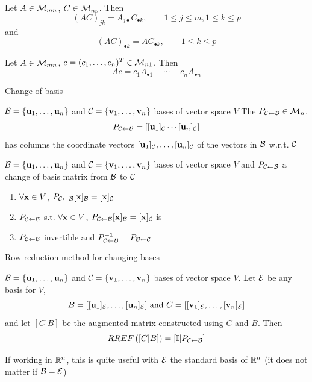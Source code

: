 \documentclass[aspectratio=169]{beamer}
\begin{document}
\begin{frame}
\begin{theorem}
Let $A\in\mathcal{M}_{mn}$, $C\in\mathcal{M}_{np}$. Then
\[
(AC)_{jk}=A_{j\bullet}C_{\bullet k},\qquad 1\leq j\leq m,1\leq k\leq p
\]
and
\[
(AC)_{\bullet k}=AC_{\bullet k},\qquad 1\leq k\leq p
\]
\end{theorem}
\vfill
\begin{theorem}
Let $A\in\mathcal{M}_{mn}$, $c=(c_1,\ldots,c_n)^T\in\mathcal{M}_{n1}$. Then
\[
Ac = c_1A_{\bullet 1}+\cdots+c_nA_{\bullet n}
\]
\end{theorem}
\end{frame}

\begin{frame}{Change of basis}
\begin{definition}
$\mathcal{B}=\{\mathbf{u}_1,\ldots,\mathbf{u}_n\}$ and $\mathcal{C}=\{\mathbf{v}_1,\ldots,\mathbf{v}_n\}$ bases of vector space $V$
The  $P_{\mathcal{C}\leftarrow\mathcal{B}}\in\mathcal{M}_n$,
\[
P_{\mathcal{C}\leftarrow\mathcal{B}}
=\left[
[\mathbf{u}_1]_{\mathcal{C}} \cdots [\mathbf{u}_n]_{\mathcal{C}}
\right]
\]
has columns the coordinate vectors $[\mathbf{u}_1]_{\mathcal{C}},\ldots,[\mathbf{u}_n]_{\mathcal{C}}$ of the vectors in $\mathcal{B}$ w.r.t. $\mathcal{C}$
\end{definition}
\vfill
\begin{theorem}
$\mathcal{B}=\{\mathbf{u}_1,\ldots,\mathbf{u}_n\}$ and $\mathcal{C}=\{\mathbf{v}_1,\ldots,\mathbf{v}_n\}$ bases of vector space $V$ and $P_{\mathcal{C}\leftarrow\mathcal{B}}$ a change of basis matrix from $\mathcal{B}$ to $\mathcal{C}$
\begin{enumerate}
\item $\forall\mathbf{x}\in V$, $P_{\mathcal{C}\leftarrow\mathcal{B}}[\mathbf{x}]_{\mathcal{B}} = [\mathbf{x}]_{\mathcal{C}}$
\item $P_{\mathcal{C}\leftarrow\mathcal{B}}$ s.t. $\forall\mathbf{x}\in V$, $P_{\mathcal{C}\leftarrow\mathcal{B}}[\mathbf{x}]_{\mathcal{B}} = [\mathbf{x}]_{\mathcal{C}}$ is 
\item $P_{\mathcal{C}\leftarrow\mathcal{B}}$ invertible and $P_{\mathcal{C}\leftarrow\mathcal{B}}^{-1}=P_{\mathcal{B}\leftarrow\mathcal{C}}$
\end{enumerate}
\end{theorem}
\end{frame}

\begin{frame}{Row-reduction method for changing bases}
\begin{theorem}
$\mathcal{B}=\{\mathbf{u}_1,\ldots,\mathbf{u}_n\}$ and $\mathcal{C}=\{\mathbf{v}_1,\ldots,\mathbf{v}_n\}$ bases of vector space $V$. Let $\mathcal{E}$ be any basis for $V$,
\[
B = [[\mathbf{u}_1]_{\mathcal{E}},\ldots,[\mathbf{u}_n]_{\mathcal{E}}] 
\textrm{ and }
C = [[\mathbf{v}_1]_{\mathcal{E}},\ldots,[\mathbf{v}_n]_{\mathcal{E}}] 
\]
and let $[C|B]$ be the augmented matrix constructed using $C$ and $B$. Then
\[
RREF\left([C|B]\right)
=[\mathbb{I}|P_{\mathcal{C}\leftarrow\mathcal{B}}]
\]
\end{theorem}

If working in $\mathbb{R}^n$, this is quite useful with $\mathcal{E}$ the standard basis of $\mathbb{R}^n$ (it does not matter if $\mathcal{B}=\mathcal{E}$)
\end{frame}
\end{document}
